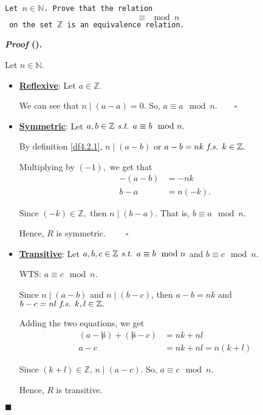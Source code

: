 \documentclass[12pt,a4paper]{article}
\newcounter{nprf}[subsection]
\newenvironment*{prf}{\par\indent\textbf{\textit{Proof} (\stepcounter{nprf}\thenprf). }\par }{\par\hfill $\blacksquare$\par}
\def\Z{{\mathbb{Z}}}
\def\N{{\mathbb{N}}}
\def\st{\emph{ s.t. }}
\def\fs{\emph{ f.s. }}
\begin{document}
\begin{framed}
\noindent\texttt{Let $n\in\N$. Prove that the relation \[\equiv\mod n\] on the set $\Z$ is an equivalence relation. }
\begin{prf}
	Let $n\in\N$.
	\begin{itemize}
		\item \textbf{\underline{Reflexive}}: Let $a\in\Z.$ $\qquad$\par\hspace{5mm} We can see that $n\mid(a-a)=0.$ So, $a\equiv a\mod n.\qquad\square$
		\item \textbf{\underline{Symmetric}}: Let $a,b\in\Z\st a\equiv b\mod n.$ $\qquad$\par\hspace{5mm} By definition \ref{df4.2.1}, $n\mid(a-b)$ or $a-b=nk\fs k\in\Z.$\par\hspace{5mm} Multiplying by $(-1),$ we get that \[\begin{aligned}-(a-b)&=-nk\\b-a&=n(-k).\end{aligned}\]\par\hspace{5mm} Since $(-k)\in\Z,$ then $n\mid(b-a).$ That is, $b\equiv a\mod n.$\par\hspace{5mm} Hence, $R$ is symmetric. $\qquad\square$
		\item \textbf{\underline{Transitive}}: Let $a,b,c\in\Z\st a\equiv b\mod n$ and $b\equiv c\mod n.$\par\hspace{5mm} WTS: $a\equiv c\mod n$.\par\hspace{5mm} Since $n\mid(a-b)$ and $n\mid(b-c)$, then $a-b=nk$ and $b-c=nl\fs k,l\in\Z.$\par\hspace{5mm} Adding the two equations, we get \[\begin{aligned}(a-\not b)+(\not b-c)&=nk+nl\\a-c&=nk+nl=n(k+l)\end{aligned}\]\par\hspace{5mm} Since $(k+l)\in\Z$, $n\mid(a-c).$ So, $a\equiv c\mod n.$\par\hspace{5mm} Hence, $R$ is transitive. 
	\end{itemize}
\end{prf}
\end{framed}
\end{document}
